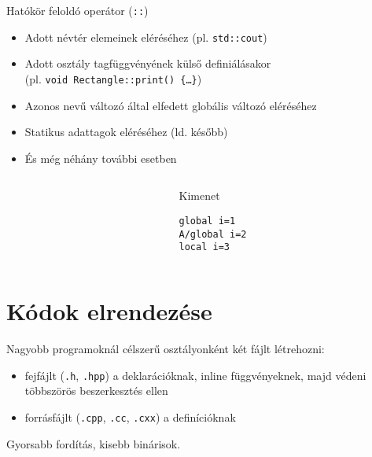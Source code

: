 \documentclass[usenames,dvipsnames,aspectratio=169]{beamer}
\begin{document}
\begin{frame}
    Hatókör feloldó operátor (\texttt{::})
    \begin{itemize}
        \item Adott névtér elemeinek eléréséhez (pl. \texttt{std::cout})
        \item Adott osztály tagfüggvényének külső definiálásakor \\
        (pl. \texttt{void Rectangle::print() \{\dots \}})
        \item Azonos nevű változó által elfedett globális változó eléréséhez
        \item Statikus adattagok eléréséhez (ld. később)
        \item És még néhány további esetben
    \end{itemize}
\end{frame}

\begin{frame}[fragile]
    \begin{columns}
        \begin{column}{0.75\textwidth}
            \begin{exampleblock}{}
                \scriptsize
                
            \end{exampleblock}
        \end{column}
        \begin{column}{0.25\textwidth}
            \begin{block}{Kimenet}
                \begin{verbatim}
global i=1
A/global i=2
local i=3
\end{verbatim}
            \end{block}
        \end{column}
    \end{columns}
\end{frame}

\section{Kódok elrendezése}

\begin{frame}
    Nagyobb programoknál célszerű osztályonként két fájlt létrehozni:
    \begin{itemize}
        \item fejfájlt (\texttt{.h}, \texttt{.hpp}) a deklarációknak, inline függvényeknek, majd védeni többszörös beszerkesztés ellen
        \item forrásfájlt (\texttt{.cpp}, \texttt{.cc}, \texttt{.cxx}) a definícióknak
    \end{itemize}
    Gyorsabb fordítás, kisebb binárisok.
    \begin{exampleblock}{}
        \footnotesize
        
    \end{exampleblock}
\end{frame}
\end{document}
